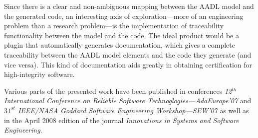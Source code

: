 Since there is a clear and non-ambiguous mapping between the AADL
model and the generated code, an interesting axis of
exploration---more of an engineering problem than a research
problem---is the implementation of traceability functionality between
the model and the code. The ideal product would be a plugin that
automatically generates documentation, which gives a complete
traceability between the AADL model elements and the code they
generate (and vice versa). This kind of documentation aids greatly in
obtaining certification for high-integrity software.

Various parts of the presented work have been published in conferences
\emph{12$^{th}$ International Conference on Reliable Software
  Technoglogies---AdaEurope'07} and \emph{$31^{st}$ IEEE/NASA Goddard
  Software Engineering Workshop---SEW'07} as well as in the April 2008
edition of the journal \emph{Innovations in Systems and Software
  Engineering}.

